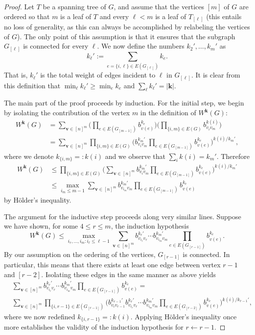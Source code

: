 \documentclass[10pt,reqno]{amsart}
\theoremstyle{definition}
\numberwithin{equation}{section}
\numberwithin{figure}{section}
\numberwithin{table}{section}
\begin{document}
\begin{proof}
Let $T$ be a spanning tree of $G$, and assume that the vertices $[m]$ of 
$G$ are ordered so that $m$ is a leaf of $T$ and every $\ell<m$ is a leaf 
of $T_{[\ell]}$ (this entails no loss of generality, as this can always be 
accomplished by relabeling the vertices of $G$). The only point of this 
assumption is that it ensures that the subgraph $G_{[\ell]}$ is connected 
for every $\ell$. We now define the numbers $k_2',\ldots,k_m'$ as
$$
	k_\ell' :=
	\sum_{e=\{i,\ell\}\in E(G_{[\ell]})} k_e.
$$
That is, $k_\ell'$ is the total weight of edges incident to $\ell$ in 
$G_{[\ell]}$. It is clear from this definition that 
$\min_\ell k_\ell'\ge\min_ek_e$ and $\sum_\ell k_\ell'=|\mathbf{k}|$.

The main part of the proof proceeds by induction. For the initial step, we 
begin by isolating the contribution of the vertex $m$ in the definition of 
$W^{\mathbf{k}}(G)$:
\begin{align*}
	W^{\mathbf{k}}(G) &=
	\sum_{\mathbf{v}\in[n]^m}
	\Bigg(
	\prod_{e\in E(G_{[m-1]})}
	b_{v(e)}^{k_e}
	\Bigg)\Bigg(
	\prod_{\{i,m\}\in E(G)} b_{v_iv_m}^{k(i)}
	\Bigg) \\
	&=
	\sum_{\mathbf{v}\in[n]^m}
	\prod_{\{i,m\}\in E(G)} 
	\Bigg(
	b_{v_iv_m}^{k_m'}
	\prod_{e\in E(G_{[m-1]})}
	b_{v(e)}^{k_e}
	\Bigg)^{k(i)/k_m'},
\end{align*}
where we denote $k_{\{i,m\}}=:k(i)$ and we observe that
$\sum_i k(i) = k_m'$. Therefore
\begin{align*}
	W^{\mathbf{k}}(G) &\le
	\prod_{\{i,m\}\in E(G)} 
	\Bigg(
	\sum_{\mathbf{v}\in[n]^m}
	b_{v_iv_m}^{k_m'}
	\prod_{e\in E(G_{[m-1]})}
	b_{v(e)}^{k_e}
	\Bigg)^{k(i)/k_m'}
	\\ &\le
	\max_{i_m\le m-1}
	\sum_{\mathbf{v}\in[n]^m}
	b_{v_{i_m}v_m}^{k_m'}
	\prod_{e\in E(G_{[m-1]})}
	b_{v(e)}^{k_e}
\end{align*}
by H\"older's inequality.

The argument for the inductive step proceeds along very similar lines. 
Suppose we have shown, for some $4\le r\le m$, the induction hypothesis
$$
	W^{\mathbf{k}}(G) \le
	\max_{i_r,\ldots,i_m:i_\ell\le \ell-1}
	\sum_{\mathbf{v}\in[n]^m}
	b_{v_{i_r}v_r}^{k_r'}\cdots
	b_{v_{i_m}v_m}^{k_m'}
	\prod_{e\in E(G_{[r-1]})}
	b_{v(e)}^{k_e}.
$$
By our assumption on the ordering of the vertices, $G_{[r-1]}$ is 
connected. In particular, this means that there exists at least one edge
between vertex $r-1$ and $[r-2]$. Isolating these edges
in the same manner as above yields
\begin{align*}
&	\sum_{\mathbf{v}\in[n]^m}
	b_{v_{i_r}v_r}^{k_r'}\cdots
	b_{v_{i_m}v_m}^{k_m'}
	\prod_{e\in E(G_{[r-1]})}
	b_{v(e)}^{k_e} = \mbox{}\\
&	\sum_{\mathbf{v}\in[n]^m}
	\prod_{\{i,r-1\}\in E(G_{[r-1]})}
\!\!
	\Bigg(
	b_{v_iv_{r-1}}^{k_{r-1}'}
	b_{v_{i_r}v_{r}}^{k_r'}\cdots
	b_{v_{i_m}v_{m}}^{k_m'}
	\prod_{e\in E(G_{[r-2]})}
	b_{v(e)}^{k_e}
	\Bigg)^{k(i)/k_{r-1}'},
\end{align*}
where we now redefined $k_{\{i,r-1\}}=:k(i)$. Applying
H\"older's inequality once more establishes the validity of the
induction hypothesis for $r\leftarrow r-1$.


\end{proof}
\end{document}
